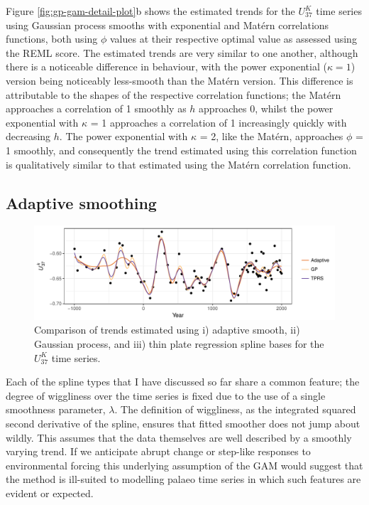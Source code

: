 \documentclass[12pt,]{article}
\newcommand{\uk}{\ensuremath{\mathit{U}^{\mathit{K}}_{\mathup{37}}}}
\begin{document}
Figure \ref{fig:gp-gam-detail-plot}b shows the estimated trends for the
\uk{} time series using Gaussian process smooths with exponential and
Matérn correlations functions, both using \(\phi\) values at their
respective optimal value as assessed using the REML score. The estimated
trends are very similar to one another, although there is a noticeable
difference in behaviour, with the power exponential (\(\kappa = 1\))
version being noticeably less-smooth than the Matérn version. This
difference is attributable to the shapes of the respective correlation
functions; the Matérn approaches a correlation of 1 smoothly as \(h\)
approaches 0, whilst the power exponential with \(\kappa\) = 1
approaches a correlation of 1 increasingly quickly with decreasing
\(h\). The power exponential with \(\kappa\) = 2, like the Matérn,
approaches \(\phi\) = 1 smoothly, and consequently the trend estimated
using this correlation function is qualitatively similar to that
estimated using the Matérn correlation function.

\subsection{Adaptive smoothing}\label{adaptive-smoothing}

\begin{figure}

{\centering \includegraphics[width=0.8\linewidth]{manuscript_files/figure-latex/braya-so-model-comparisons-1} 

}

\caption{Comparison of trends estimated using i) adaptive smooth, ii) Gaussian process, and iii) thin plate regression spline bases for the \uk{} time series.}\label{fig:braya-so-model-comparisons}
\end{figure}

Each of the spline types that I have discussed so far share a common
feature; the degree of wiggliness over the time series is fixed due to
the use of a single smoothness parameter, \(\lambda\). The definition of
wiggliness, as the integrated squared second derivative of the spline,
ensures that fitted smoother does not jump about wildly. This assumes
that the data themselves are well described by a smoothly varying trend.
If we anticipate abrupt change or step-like responses to environmental
forcing this underlying assumption of the GAM would suggest that the
method is ill-suited to modelling palaeo time series in which such
features are evident or expected.
\end{document}

